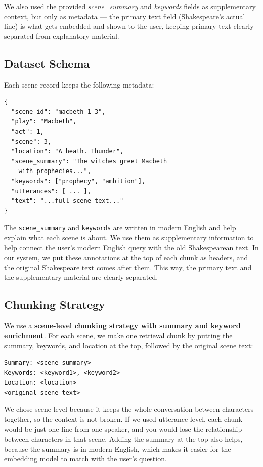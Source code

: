 \documentclass[10pt,conference]{IEEEtran}
\begin{document}
We also used the provided \textit{scene\_summary} and \textit{keywords} fields as supplementary context, but only as metadata — the primary text field (Shakespeare's actual line) is what gets embedded and shown to the user, keeping primary text clearly separated from explanatory material.

\subsection{Dataset Schema}

Each scene record keeps the following metadata:

\begin{lstlisting}[language={}]
{
  "scene_id": "macbeth_1_3",
  "play": "Macbeth",
  "act": 1,
  "scene": 3,
  "location": "A heath. Thunder",
  "scene_summary": "The witches greet Macbeth
    with prophecies...",
  "keywords": ["prophecy", "ambition"],
  "utterances": [ ... ],
  "text": "...full scene text..."
}
\end{lstlisting}

The \texttt{scene\_summary} and \texttt{keywords} are written in modern English and help explain what each scene is about. We use them as supplementary information to help connect the user's modern English query with the old Shakespearean text. In our system, we put these annotations at the top of each chunk as headers, and the original Shakespeare text comes after them. This way, the primary text and the supplementary material are clearly separated.

\subsection{Chunking Strategy}

We use a \textbf{scene-level chunking strategy with summary and keyword enrichment}. For each scene, we make one retrieval chunk by putting the summary, keywords, and location at the top, followed by the original scene text:

\begin{lstlisting}[language={}]
Summary: <scene_summary>
Keywords: <keyword1>, <keyword2>
Location: <location>
<original scene text>
\end{lstlisting}

We chose scene-level because it keeps the whole conversation between characters together, so the context is not broken. If we used utterance-level, each chunk would be just one line from one speaker, and you would lose the relationship between characters in that scene. Adding the summary at the top also helps, because the summary is in modern English, which makes it easier for the embedding model to match with the user's question.
\end{document}
